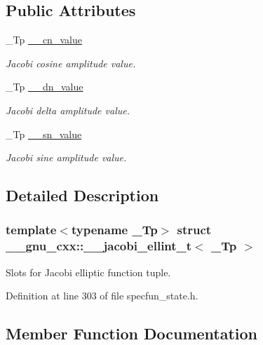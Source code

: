 \subsection*{Public Attributes}
\begin{DoxyCompactItemize}
\item 
\+\_\+\+Tp \hyperlink{struct____gnu__cxx_1_1____jacobi__ellint__t_a2ea9630244e97bfe0e182dbb5682ee30}{\+\_\+\+\_\+cn\+\_\+value}
\begin{DoxyCompactList}\small\item\em Jacobi cosine amplitude value. \end{DoxyCompactList}\item 
\+\_\+\+Tp \hyperlink{struct____gnu__cxx_1_1____jacobi__ellint__t_a08d15b208e574536f8c6113fc7d0c9a9}{\+\_\+\+\_\+dn\+\_\+value}
\begin{DoxyCompactList}\small\item\em Jacobi delta amplitude value. \end{DoxyCompactList}\item 
\+\_\+\+Tp \hyperlink{struct____gnu__cxx_1_1____jacobi__ellint__t_a011eb5bb9a1a6d845a26f17b485cf3d4}{\+\_\+\+\_\+sn\+\_\+value}
\begin{DoxyCompactList}\small\item\em Jacobi sine amplitude value. \end{DoxyCompactList}\end{DoxyCompactItemize}


\subsection{Detailed Description}
\subsubsection*{template$<$typename \+\_\+\+Tp$>$\newline
struct \+\_\+\+\_\+gnu\+\_\+cxx\+::\+\_\+\+\_\+jacobi\+\_\+ellint\+\_\+t$<$ \+\_\+\+Tp $>$}

Slots for Jacobi elliptic function tuple. 

Definition at line 303 of file specfun\+\_\+state.\+h.



\subsection{Member Function Documentation}
\mbox{\label{struct____gnu__cxx_1_1____jacobi__ellint__t_ab9ac21f42a1fc90e86ba76394e413ea7}} 
